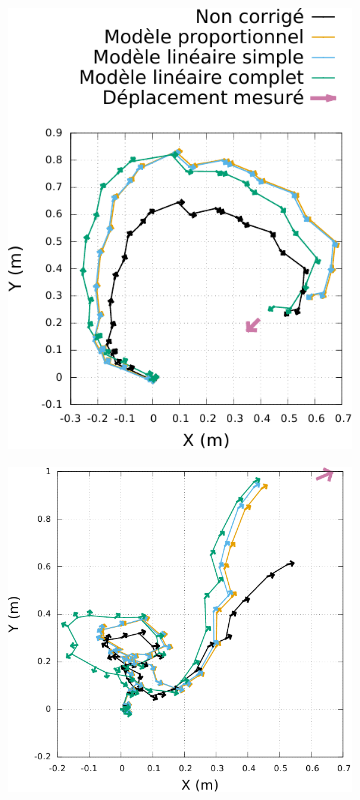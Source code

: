 \begin{figure}[h]
\begin{subfigure}{0.28\paperwidth}
        \includegraphics[type=pdf,ext=.pdf,read=.pdf,width=1.0\linewidth]{../plot/OdometryCMAES/readsTraj3}
    \end{subfigure}
    \newline
    \begin{subfigure}{0.28\paperwidth}
        \centering
        \includegraphics[type=pdf,ext=.pdf,read=.pdf,width=1.0\linewidth]{../plot/OdometryCMAES/readsTraj4}

\end{subfigure}
\end{figure}
